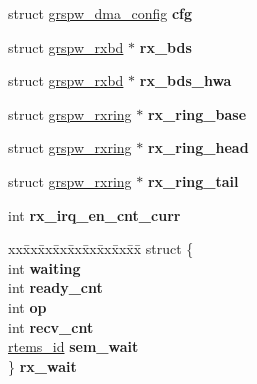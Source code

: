 \begin{DoxyCompactItemize}
\item 
\mbox{\label{structgrspw__dma__priv_ac69d9ee98baa66c67c5a720b21593dd9}} 
struct \mbox{\hyperlink{structgrspw__dma__config}{grspw\+\_\+dma\+\_\+config}} {\bfseries cfg}
\item 
\mbox{\label{structgrspw__dma__priv_ab728f4ffaea8f25e38bdaed8d03eafd3}} 
struct \mbox{\hyperlink{structgrspw__rxbd}{grspw\+\_\+rxbd}} $\ast$ {\bfseries rx\+\_\+bds}
\item 
\mbox{\label{structgrspw__dma__priv_a4fb7dc2016bd5a6b49a4c713697082e9}} 
struct \mbox{\hyperlink{structgrspw__rxbd}{grspw\+\_\+rxbd}} $\ast$ {\bfseries rx\+\_\+bds\+\_\+hwa}
\item 
\mbox{\label{structgrspw__dma__priv_a4938f4329bf091ee7e7c78381cbe8cf5}} 
struct \mbox{\hyperlink{structgrspw__rxring}{grspw\+\_\+rxring}} $\ast$ {\bfseries rx\+\_\+ring\+\_\+base}
\item 
\mbox{\label{structgrspw__dma__priv_af8e63ac47a5052994470d445cac8e522}} 
struct \mbox{\hyperlink{structgrspw__rxring}{grspw\+\_\+rxring}} $\ast$ {\bfseries rx\+\_\+ring\+\_\+head}
\item 
\mbox{\label{structgrspw__dma__priv_a74c40f178469baa481e447ec95629f82}} 
struct \mbox{\hyperlink{structgrspw__rxring}{grspw\+\_\+rxring}} $\ast$ {\bfseries rx\+\_\+ring\+\_\+tail}
\item 
\mbox{\label{structgrspw__dma__priv_a0f4c0cb1389738201e533f3a0dc67119}} 
int {\bfseries rx\+\_\+irq\+\_\+en\+\_\+cnt\+\_\+curr}
\item 
\mbox{\label{structgrspw__dma__priv_a763b4057912480bf96d0779821944e81}} 
\begin{tabbing}
xx\=xx\=xx\=xx\=xx\=xx\=xx\=xx\=xx\=\kill
struct \{\\
\>int {\bfseries waiting}\\
\>int {\bfseries ready\_cnt}\\
\>int {\bfseries op}\\
\>int {\bfseries recv\_cnt}\\
\>\mbox{\hyperlink{group__ClassicTasks_gab20892b814dced7dd4e5b9bf42becd57}{rtems\_id}} {\bfseries sem\_wait}\\
\} {\bfseries rx\_wait}\\


\end{tabbing}
\end{DoxyCompactItemize}
